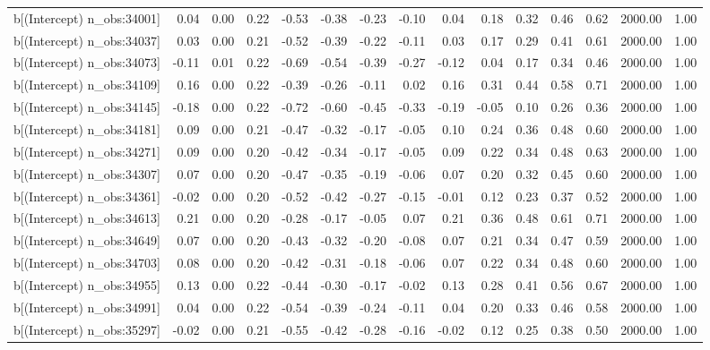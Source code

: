 \begin{table}[ht]
\begin{tabular}{rrrrrrrrrrrrrrr}
  b[(Intercept) n\_obs:34001] & 0.04 & 0.00 & 0.22 & -0.53 & -0.38 & -0.23 & -0.10 & 0.04 & 0.18 & 0.32 & 0.46 & 0.62 & 2000.00 & 1.00 \\ 
  b[(Intercept) n\_obs:34037] & 0.03 & 0.00 & 0.21 & -0.52 & -0.39 & -0.22 & -0.11 & 0.03 & 0.17 & 0.29 & 0.41 & 0.61 & 2000.00 & 1.00 \\ 
  b[(Intercept) n\_obs:34073] & -0.11 & 0.01 & 0.22 & -0.69 & -0.54 & -0.39 & -0.27 & -0.12 & 0.04 & 0.17 & 0.34 & 0.46 & 2000.00 & 1.00 \\ 
  b[(Intercept) n\_obs:34109] & 0.16 & 0.00 & 0.22 & -0.39 & -0.26 & -0.11 & 0.02 & 0.16 & 0.31 & 0.44 & 0.58 & 0.71 & 2000.00 & 1.00 \\ 
  b[(Intercept) n\_obs:34145] & -0.18 & 0.00 & 0.22 & -0.72 & -0.60 & -0.45 & -0.33 & -0.19 & -0.05 & 0.10 & 0.26 & 0.36 & 2000.00 & 1.00 \\ 
  b[(Intercept) n\_obs:34181] & 0.09 & 0.00 & 0.21 & -0.47 & -0.32 & -0.17 & -0.05 & 0.10 & 0.24 & 0.36 & 0.48 & 0.60 & 2000.00 & 1.00 \\ 
  b[(Intercept) n\_obs:34271] & 0.09 & 0.00 & 0.20 & -0.42 & -0.34 & -0.17 & -0.05 & 0.09 & 0.22 & 0.34 & 0.48 & 0.63 & 2000.00 & 1.00 \\ 
  b[(Intercept) n\_obs:34307] & 0.07 & 0.00 & 0.20 & -0.47 & -0.35 & -0.19 & -0.06 & 0.07 & 0.20 & 0.32 & 0.45 & 0.60 & 2000.00 & 1.00 \\ 
  b[(Intercept) n\_obs:34361] & -0.02 & 0.00 & 0.20 & -0.52 & -0.42 & -0.27 & -0.15 & -0.01 & 0.12 & 0.23 & 0.37 & 0.52 & 2000.00 & 1.00 \\ 
  b[(Intercept) n\_obs:34613] & 0.21 & 0.00 & 0.20 & -0.28 & -0.17 & -0.05 & 0.07 & 0.21 & 0.36 & 0.48 & 0.61 & 0.71 & 2000.00 & 1.00 \\ 
  b[(Intercept) n\_obs:34649] & 0.07 & 0.00 & 0.20 & -0.43 & -0.32 & -0.20 & -0.08 & 0.07 & 0.21 & 0.34 & 0.47 & 0.59 & 2000.00 & 1.00 \\ 
  b[(Intercept) n\_obs:34703] & 0.08 & 0.00 & 0.20 & -0.42 & -0.31 & -0.18 & -0.06 & 0.07 & 0.22 & 0.34 & 0.48 & 0.60 & 2000.00 & 1.00 \\ 
  b[(Intercept) n\_obs:34955] & 0.13 & 0.00 & 0.22 & -0.44 & -0.30 & -0.17 & -0.02 & 0.13 & 0.28 & 0.41 & 0.56 & 0.67 & 2000.00 & 1.00 \\ 
  b[(Intercept) n\_obs:34991] & 0.04 & 0.00 & 0.22 & -0.54 & -0.39 & -0.24 & -0.11 & 0.04 & 0.20 & 0.33 & 0.46 & 0.58 & 2000.00 & 1.00 \\ 
  b[(Intercept) n\_obs:35297] & -0.02 & 0.00 & 0.21 & -0.55 & -0.42 & -0.28 & -0.16 & -0.02 & 0.12 & 0.25 & 0.38 & 0.50 & 2000.00 & 1.00 \\ 

\end{tabular}
\end{table}
